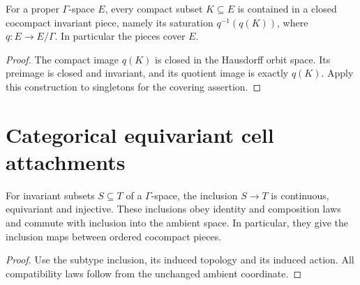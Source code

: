 \begin{proposition}\label{prop:cocompact-pieces-cover}
For a proper $\Gamma$-space $E$, every compact subset $K\subseteq E$
is contained in a closed cocompact invariant piece, namely its saturation
$q^{-1}(q(K))$, where $q:E\to E/\Gamma$. In particular the pieces cover $E$.
\end{proposition}
\begin{proof}
\leanok
The compact image $q(K)$ is closed in the Hausdorff orbit space. Its
preimage is closed and invariant, and its quotient image is exactly
$q(K)$. Apply this construction to singletons for the covering assertion.
\end{proof}

\section{Categorical equivariant cell attachments}

\begin{proposition}\label{prop:invariant-subspace-inclusions}
\leanok
For invariant subsets $S\subseteq T$ of a $\Gamma$-space, the inclusion
$S\to T$ is continuous, equivariant and injective. These inclusions obey
identity and composition laws and commute with inclusion into the ambient
space. In particular, they give the inclusion maps between ordered
cocompact pieces.
\end{proposition}
\begin{proof}
\leanok
Use the subtype inclusion, its induced topology and its induced action.
All compatibility laws follow from the unchanged ambient coordinate.
\end{proof}

